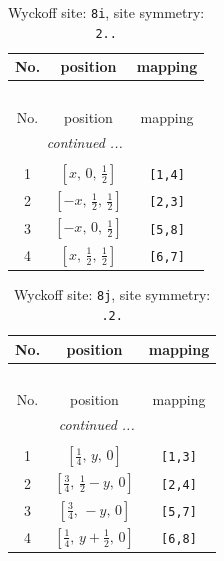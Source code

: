 \documentclass[fleqn,8pt]{jsarticle}
\begin{document}
\begin{longtable}{ccc}
\caption{Wyckoff site: {\tt 8i}, site symmetry: {\tt 2..}}
 \\
 \hline \hline
No. & position & mapping \\ \hline \endfirsthead

\multicolumn{2}{l}{\tablename\ \thetable{}} \\
 \hline \hline
No. & position & mapping \\ \hline \endhead

 \hline \hline
\multicolumn{2}{r}{\footnotesize\it continued ...} \\ \endfoot

 \hline \hline
\multicolumn{2}{r}{} \\ \endlastfoot

1 & $\left[ x,\, 0,\, \frac{1}{2} \right]$ & {\tt [1,4]} \\ \hline
2 & $\left[ - x,\, \frac{1}{2},\, \frac{1}{2} \right]$ & {\tt [2,3]} \\ \hline
3 & $\left[ - x,\, 0,\, \frac{1}{2} \right]$ & {\tt [5,8]} \\ \hline
4 & $\left[ x,\, \frac{1}{2},\, \frac{1}{2} \right]$ & {\tt [6,7]} \\
\end{longtable}
\renewcommand{\arraystretch}{1.2}
\begin{longtable}{ccc}
\caption{Wyckoff site: {\tt 8j}, site symmetry: {\tt .2.}}
 \\
 \hline \hline
No. & position & mapping \\ \hline \endfirsthead

\multicolumn{2}{l}{\tablename\ \thetable{}} \\
 \hline \hline
No. & position & mapping \\ \hline \endhead

 \hline \hline
\multicolumn{2}{r}{\footnotesize\it continued ...} \\ \endfoot

 \hline \hline
\multicolumn{2}{r}{} \\ \endlastfoot

1 & $\left[ \frac{1}{4},\, y,\, 0 \right]$ & {\tt [1,3]} \\ \hline
2 & $\left[ \frac{3}{4},\, \frac{1}{2} - y,\, 0 \right]$ & {\tt [2,4]} \\ \hline
3 & $\left[ \frac{3}{4},\, - y,\, 0 \right]$ & {\tt [5,7]} \\ \hline
4 & $\left[ \frac{1}{4},\, y + \frac{1}{2},\, 0 \right]$ & {\tt [6,8]} \\
\end{longtable}
\end{document}
